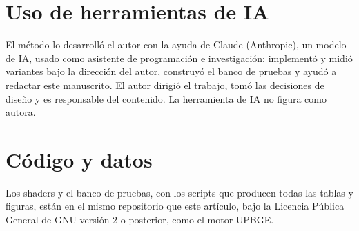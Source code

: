 \documentclass[11pt,a4paper]{article}
\begin{document}
\section*{Uso de herramientas de IA}
El método lo desarrolló el autor con la ayuda de Claude (Anthropic), un modelo de IA, usado como asistente de programación e investigación: implementó y midió variantes bajo la dirección del autor, construyó el banco de pruebas y ayudó a redactar este manuscrito. El autor dirigió el trabajo, tomó las decisiones de diseño y es responsable del contenido. La herramienta de IA no figura como autora.

\section*{Código y datos}
Los shaders y el banco de pruebas, con los scripts que producen todas las tablas y figuras, están en el mismo repositorio que este artículo, bajo la Licencia Pública General de GNU versión 2 o posterior, como el motor UPBGE.



\end{document}
